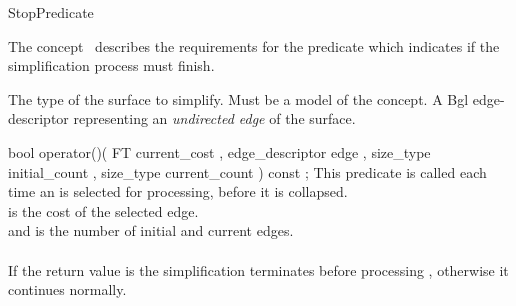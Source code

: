 
\begin{ccRefConcept}{StopPredicate}


\ccDefinition

The concept \ccRefName\ describes the requirements for the predicate which indicates if the simplification process must finish.

\ccTypes
  {The type of the surface to simplify. Must be a model of the  concept.}{}
\ccGlue    
\ccGlue    
\ccGlue    
  {A {\sc Bgl edge-descriptor} representing an {\em undirected edge} of the surface.}

\ccCreation
{}  %

\ccOperations

  \ccMethod
    {bool  operator()( FT              current_cost
                     , edge_descriptor edge
                     , size_type       initial_count
                     , size_type       current_count
                     ) const ;
    }
    {
    This predicate is called each time an  is selected for processing,
     before it is collapsed.\\
     is the cost of the selected edge.\\
     and  is the number of initial and current edges.\\
    \\
    If the return value is  the simplification terminates before processing ,
    otherwise it continues normally.
    }
  
\ccHasModels
{}

\end{ccRefConcept}

